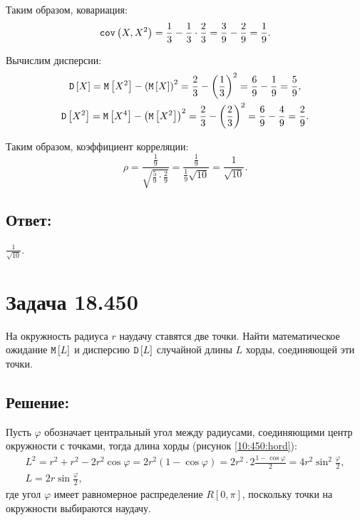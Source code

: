 Таким образом, ковариация:
\begin{equation}
    \texttt{cov} \left ( X , X^2 \right ) = \frac{1}{3} - \frac{1}{3} \cdot \frac{2}{3} = \frac{3}{9} - \frac{2}{9} = \frac{1}{9} .
\end{equation}

Вычислим дисперсии:
\begin{gather}
    \mathtt{D} \left [ X \right ] = \mathtt{M} \left [ X^2 \right ] - \left ( \mathtt{M} \left [ X \right ] \right )^2 = \frac{2}{3} - \left ( \frac{1}{3} \right )^2 = \frac{6}{9} - \frac{1}{9} = \frac{5}{9} , \\
    \mathtt{D} \left [ X^2 \right ] = \mathtt{M} \left [ X^4 \right ] - \left ( \mathtt{M} \left [ X^2 \right ] \right )^2 = \frac{2}{3} - \left ( \frac{2}{3} \right )^2 = \frac{6}{9} - \frac{4}{9} = \frac{2}{9}.
\end{gather}

Таким образом, коэффициент корреляции:
\begin{equation}
    \rho = \frac{\frac{1}{9}}{\sqrt{\frac{5}{9} \cdot \frac{2}{9}}} = \frac{\frac{1}{9}}{\frac{1}{9} \sqrt{10}} = \frac{1}{\sqrt{10}} .
\end{equation}

\subsection*{Ответ:}
$\frac{1}{\sqrt{10}}$.

\section*{Задача 18.450}

На окружность радиуса $r$ наудачу ставятся две точки. Найти математическое ожидание $\mathtt{M} \left [ L \right ]$ и дисперсию $\mathtt{D} \left [ L \right ]$ случайной длины
$L$ хорды, соединяющей эти точки.

\subsection*{Решение:}

Пусть $\varphi$ обозначает центральный угол между радиусами, соединяющими центр окружности с точками, тогда длина хорды (рисунок \ref{10:450:hord}):
\begin{gather}
    L^2
    = r^2 + r^2 - 2 r^2 \cos \varphi
    = 2 r^2 \left ( 1 - \cos \varphi \right )
    = 2 r^2 \cdot 2 \frac{1 - \cos \varphi}{2}
    = 4 r^2 \sin^2 \frac{\varphi}{2} , \\
    L
    = 2 r \sin \frac{\varphi}{2} ,
\end{gather}
где угол $\varphi$ имеет равномерное распределение $R \left [ 0, \pi \right ]$, поскольку точки на окружности выбираются наудачу.

